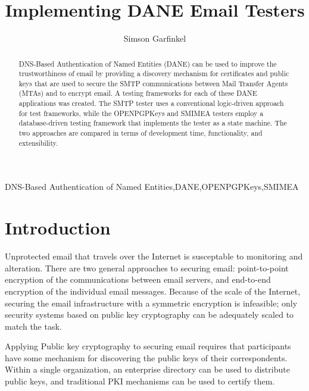 \documentclass[preprint,3p,11pt]{elsarticle}
\begin{document}
\begin{frontmatter}

\title{Implementing DANE Email Testers}

\author{Simson Garfinkel}

\begin{abstract}
DNS-Based Authentication of Named Entities (DANE) can be used to
improve the trustworthiness of email by providing a discovery
mechanism for certificates and public keys that are used to secure the  SMTP communications
between Mail Transfer Agents (MTAs) and to encrypt email. A testing
frameworks for each of these DANE applications was created. The SMTP
tester uses a conventional logic-driven approach for test
frameworks, while the OPENPGPKeys and SMIMEA testers employ a
database-driven testing framework that implements the tester as a
state machine. The two approaches are compared in terms of
development time, functionality, and extensibility.
\end{abstract}

\begin{keyword}
DNS-Based Authentication of Named Entities\sep DANE\sep OPENPGPKeys\sep SMIMEA
\end{keyword}

\end{frontmatter}

\tableofcontents


\section{Introduction}

Unprotected email that travels over the Internet is susceptable to monitoring and
alteration. There are two general approaches to securing email:
point-to-point encryption of the communications between email
servers, and end-to-end encryption of the individual email
messages. Because of the scale of the Internet, securing the email
infrastructure with a symmetric encryption is infeasible; only security systems based
on public key cryptography can be adequately scaled to match the task.

Applying Public key cryptography to securing email requires that participants have some mechanism
for discovering the public keys of their correspondents. Within a single organization,
an enterprise directory can be used to distribute public
keys, and traditional PKI mechanisms\cite{rfc5280} can be used to certify them. 
\end{document}
